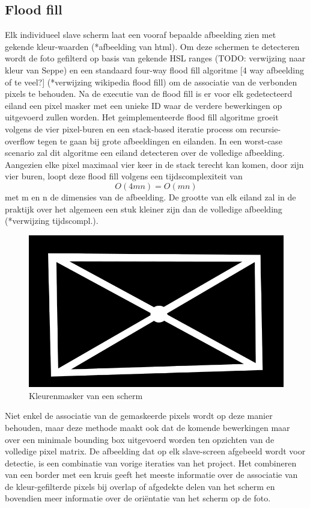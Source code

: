 
\subsection{Flood fill}
Elk individueel slave scherm laat een vooraf bepaalde afbeelding zien met gekende kleur-waarden (*afbeelding van html). Om deze schermen te detecteren wordt de foto gefilterd op basis van gekende HSL ranges (TODO: verwijzing naar kleur van Seppe) en een standaard four-way flood fill algoritme [4 way afbeelding of te veel?] (*verwijzing wikipedia flood fill) om de associatie van de verbonden pixels te behouden. Na de executie van de flood fill is er voor elk gedetecteerd eiland een pixel masker met een unieke ID waar de verdere bewerkingen op uitgevoerd zullen worden. Het geimplementeerde flood fill algoritme groeit volgens de vier pixel-buren en een stack-based iteratie process om recursie-overflow tegen te gaan bij grote afbeeldingen en eilanden. In een worst-case scenario zal dit algoritme een eiland detecteren over de volledige afbeelding. Aangezien elke pixel maximaal vier keer in de stack terecht kan komen, door zijn vier buren, loopt deze flood fill volgens een tijdscomplexiteit van 
\[O(4mn)=O(mn)\]
 met m en n de dimensies van de afbeelding. De grootte van elk eiland zal in de praktijk over het algemeen een stuk kleiner zijn dan de volledige afbeelding (*verwijzing tijdscompl.).

\begin{figure}[h]
\centering
\includegraphics[scale=0.6]{img/mask.png}
\caption{Kleurenmasker van een scherm}
\end{figure}

Niet enkel de associatie van de gemaskeerde pixels wordt op deze manier behouden, maar deze methode maakt ook dat de komende bewerkingen maar over een minimale bounding box uitgevoerd worden ten opzichten van de volledige pixel matrix.
De afbeelding dat op elk slave-screen afgebeeld wordt voor detectie, is een combinatie van vorige iteraties van het project. Het combineren van een border met een kruis geeft het meeste informatie over de associatie van de kleur-gefilterde pixels bij overlap of afgedekte delen van het scherm en bovendien meer informatie over de oriëntatie van het scherm op de foto.

